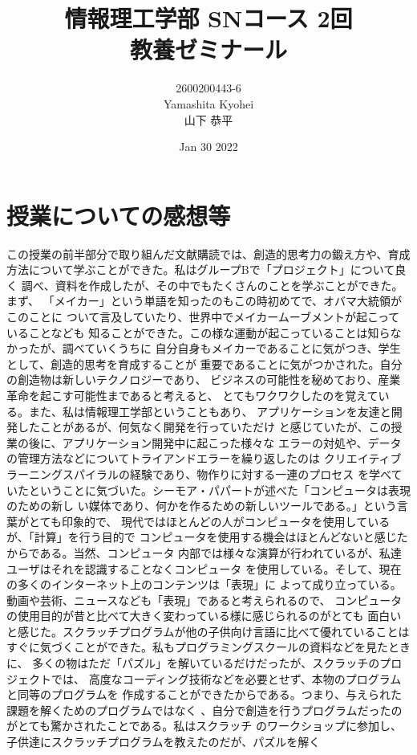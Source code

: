 \documentclass[dvipdfmx,autodetect-engine,titlepage]{jsarticle}
\title{情報理工学部 SNコース 2回\\
教養ゼミナール\\
}
\author{2600200443-6\\Yamashita Kyohei\\山下 恭平}
\date{Jan 30 2022}
\begin{document}
\maketitle

\section{授業についての感想等}
この授業の前半部分で取り組んだ文献購読では、創造的思考力の鍛え方や、育成
方法について学ぶことができた。私はグループBで「プロジェクト」について良く
調べ、資料を作成したが、その中でもたくさんのことを学ぶことができた。まず、
「メイカー」という単語を知ったのもこの時初めてで、オバマ大統領がこのことに
ついて言及していたり、世界中でメイカームーブメントが起こっていることなども
知ることができた。この様な運動が起こっていることは知らなかったが、調べていくうちに
自分自身もメイカーであることに気がつき、学生として、創造的思考を育成することが
重要であることに気がつかされた。自分の創造物は新しいテクノロジーであり、
ビジネスの可能性を秘めており、産業革命を起こす可能性まであると考えると、
とてもワクワクしたのを覚えている。また、私は情報理工学部ということもあり、
アプリケーションを友達と開発したことがあるが、何気なく開発を行っていただけ
と感じていたが、この授業の後に、アプリケーション開発中に起こった様々な
エラーの対処や、データの管理方法などについてトライアンドエラーを繰り返したのは
クリエイティブラーニングスパイラルの経験であり、物作りに対する一連のプロセス
を学べていたということに気づいた。シーモア・パパートが述べた「コンピュータは表現のための新し
い媒体であり、何かを作るための新しいツールである。」という言葉がとても印象的で、
現代ではほとんどの人がコンピュータを使用しているが、「計算」を行う目的で
コンピュータを使用する機会はほとんどないと感じたからである。当然、コンピュータ
内部では様々な演算が行われているが、私達ユーザはそれを認識することなくコンピュータ
を使用している。そして、現在の多くのインターネット上のコンテンツは「表現」に
よって成り立っている。動画や芸術、ニュースなども「表現」であると考えられるので、
コンピュータの使用目的が昔と比べて大きく変わっている様に感じられるのがとても
面白いと感じた。スクラッチプログラムが他の子供向け言語に比べて優れていることは
すぐに気づくことができた。私もプログラミングスクールの資料などを見たときに、
多くの物はただ「パズル」を解いているだけだったが、スクラッチのプロジェクトでは、
高度なコーディング技術などを必要とせず、本物のプログラムと同等のプログラムを
作成することができたからである。つまり、与えられた課題を解くためのプログラムではなく
、自分で創造を行うプログラムだったのがとても驚かされたことである。私はスクラッチ
のワークショップに参加し、子供達にスクラッチプログラムを教えたのだが、パズルを解く
\end{document}
